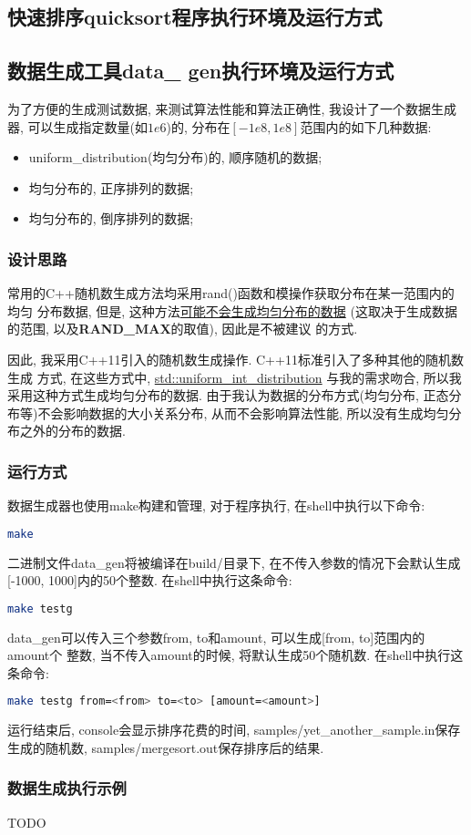 \subsection{快速排序quicksort程序执行环境及运行方式}

\subsection{数据生成工具data\_ gen执行环境及运行方式}
为了方便的生成测试数据, 来测试算法性能和算法正确性, 我设计了一个数据生成器,
可以生成指定数量(如$1e6$)的, 分布在$[-1e8, 1e8]$范围内的如下几种数据:
\begin{itemize}
  \item uniform\_distribution(均匀分布)的, 顺序随机的数据;
  \item 均匀分布的, 正序排列的数据;
  \item 均匀分布的, 倒序排列的数据;
\end{itemize}

\subsubsection{设计思路}
常用的C++随机数生成方法均采用rand()函数和模操作获取分布在某一范围内的均匀
分布数据, 但是, 这种方法\href{https://stackoverflow.com/a/52869953}
{可能不会生成均匀分布的数据}
(这取决于生成数据的范围, 以及\textbf{RAND\_MAX}的取值), 因此是不被建议
的方式.\par

因此, 我采用C++11引入的随机数生成操作. C++11标准引入了多种其他的随机数生成
方式, 在这些方式中, \href{http://en.cppreference.com/w/cpp/numeric/random/uniform\_int\_distribution}
{std::uniform\_int\_distribution}
与我的需求吻合, 所以我采用这种方式生成均匀分布的数据.
由于我认为数据的分布方式(均匀分布, 正态分布等)不会影响数据的大小关系分布, 
从而不会影响算法性能, 所以没有生成均匀分布之外的分布的数据.

\subsubsection{运行方式}
数据生成器也使用make构建和管理, 对于程序执行, 在shell中执行以下命令:
\begin{lstlisting}[language=bash]
make
\end{lstlisting}
二进制文件data\_gen将被编译在build/目录下, 在不传入参数的情况下会默认生成
[-1000, 1000]内的50个整数. 在shell中执行这条命令:
\begin{lstlisting}[language=bash]
make testg
\end{lstlisting}
data\_gen可以传入三个参数from, to和amount, 可以生成[from, to]范围内的amount个
整数, 当不传入amount的时候, 将默认生成50个随机数. 在shell中执行这条命令:
\begin{lstlisting}[language=bash]
make testg from=<from> to=<to> [amount=<amount>]
\end{lstlisting}
运行结束后, console会显示排序花费的时间, samples/yet\_another\_sample.in保存
生成的随机数, samples/mergesort.out保存排序后的结果.

\subsubsection{数据生成执行示例}
TODO
